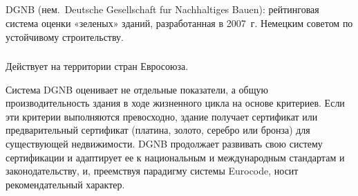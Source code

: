 \subsection{}
DGNB (\mbox{нем.}~Deutsche Gesellschaft fur Nachhaltiges Bauen): рейтинговая система оценки «зеленых» зданий, разработанная в 2007~г. Немецким советом по устойчивому строительству.



\subsubsection*{\scAssesmentScope}
Действует на территории стран Евросоюза.

Система DGNB оценивает не отдельные показатели, а общую производительность здания в ходе жизненного цикла на основе критериев.
Если эти критерии выполняются превосходно, здание получает сертификат или предварительный сертификат (платина, золото, серебро или бронза) для существующей недвижимости.
DGNB продолжает развивать свою систему сертификации и адаптирует ее к национальным и международным стандартам и законодательству,
и, преемствуя парадигму системы Eurocode, носит рекомендательный характер.

